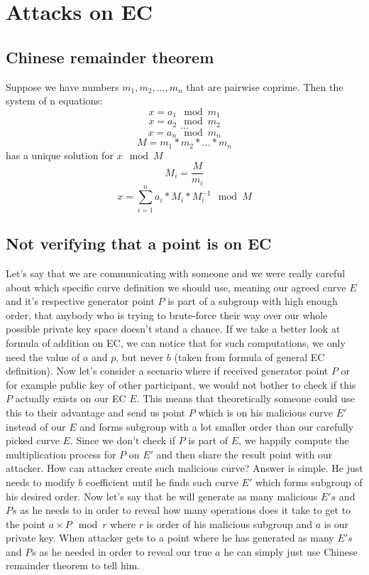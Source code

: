 \documentclass[bp,en]{FEIstyle}
\begin{document}
\newpage


\section*{Attacks on EC}

\subsection*{Chinese remainder theorem}
Suppose we have numbers $m_1,m_2,...,m_n$ that are pairwise coprime. Then the system of n equations: 
\[
x = a_1 \mod m_1
\]
\[
x = a_2 \mod m_2
\]
\[
...
\]
\[
x = a_n \mod m_n
\]
\[
M=m_1*m_2*...*m_n 
\]
has a unique solution for $x \mod M$ 
\[
M_i = \frac{M}{m_i}
\]
\[
x = \sum_{i=1}^{n} a_i*M_i*M_i^{-1}\mod M
\]
\subsection*{Not verifying that a point is on EC}
Let's say that we are communicating with someone and we were really careful about which specific curve definition we should use, meaning our agreed curve $E$ and it's respective generator point $P$ is part of a subgroup with high enough order, that anybody who is trying to brute-force their way over our whole possible private key space doesn't stand a chance. If we take a better look at formula of addition on EC, we can notice that for such computations, we only need the value of $a$ and $p$, but never $b$ (taken from formula of general EC definition). Now let's consider a scenario where if received generator point $P$ or for example public key of other participant, we would not bother to check if this $P$ actually exists on our EC $E$. This means that theoretically someone could use this to their advantage and send us point $P$ which is on his malicious curve $E'$ instead of our $E$ and forms subgroup with a lot smaller order than our carefully picked curve $E$. Since we don't check if $P$ is part of $E$, we happily compute the multiplication process for $P$ on $E'$ and then share the result point with our attacker. How can attacker create such malicious curve? Answer is simple. He just needs to modify $b$ coefficient until he finds such curve $E'$ which forms subgroup of his desired order. Now let's say that he will generate as many malicious $E's$ and $Ps$ as he needs to in order to reveal how many operations does it take to get to the point $a\times P \mod r$ where $r$ is order of his malicious subgroup and $a$ is our private key. When attacker gets to a point where he has generated as many $E's$ and $Ps$ as he needed in order to reveal our true $a$ he can simply just use Chinese remainder theorem to tell him.   
\end{document}
